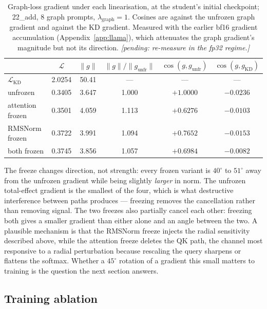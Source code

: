 \documentclass{article}
\newcommand{\pending}[1]{{\color{BurntOrange}\emph{[pending#1]}}}
\begin{document}
\begin{table}[h]
  \centering
  \caption{Graph-loss gradient under each linearisation, at the student's initial checkpoint;
  22\_add, 8 graph prompts, $\lambda_{\mathrm{graph}}=1$. Cosines are against the unfrozen graph
  gradient and against the KD gradient. Measured with the earlier bf16 gradient accumulation
  (Appendix~\ref{app:llama}), which attenuates the graph gradient's magnitude but not its
  direction. \pending{: re-measure in the fp32 regime.}}
  \label{tab:freeze-grad}
  \begin{tabular}{lccccc}
    \toprule
    & $\mathcal{L}$ & $\|g\|$ & $\|g\|/\|g_{\mathrm{unfr}}\|$ & $\cos(g, g_{\mathrm{unfr}})$ & $\cos(g, g_{\mathrm{KD}})$ \\
    \midrule
    $\mathcal{L}_{\mathrm{KD}}$ & 2.0254 & 50.41 & --- & --- & --- \\
    \midrule
    unfrozen                    & 0.3405 & 3.647 & 1.000 & $+1.0000$ & $-0.0236$ \\
    attention frozen            & 0.3501 & 4.059 & 1.113 & $+0.6276$ & $-0.0103$ \\
    RMSNorm frozen              & 0.3722 & 3.991 & 1.094 & $+0.7652$ & $-0.0153$ \\
    both frozen                 & 0.3745 & 3.856 & 1.057 & $+0.6984$ & $-0.0082$ \\
    \bottomrule
  \end{tabular}
\end{table}

The freeze changes direction, not strength: every frozen variant is $40^\circ$ to $51^\circ$ away
from the unfrozen gradient while being slightly \emph{larger} in norm. The unfrozen total-effect
gradient is the smallest of the four, which is what destructive interference between paths
produces --- freezing removes the cancellation rather than removing signal. The two freezes also
partially cancel each other: freezing both gives a smaller gradient than either alone and an angle
between the two. A plausible mechanism is that the RMSNorm freeze injects the radial sensitivity
described above, while the attention freeze deletes the QK path, the channel most responsive to a
radial perturbation because rescaling the query sharpens or flattens the softmax. Whether a
$45^\circ$ rotation of a gradient this small matters to training is the question the next section
answers.

\subsection{Training ablation}
\label{sec:freeze-train}
\end{document}
